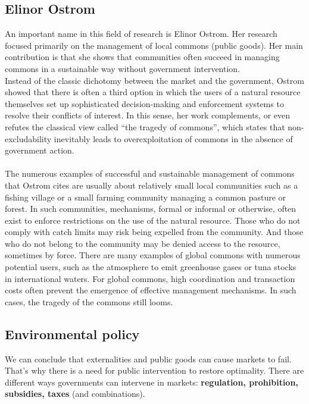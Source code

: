 \documentclass[../summary.tex]{subfiles}
\begin{document}
	\subsection{Elinor Ostrom}
	
	An important name in this field of research is Elinor Ostrom. Her research focused primarily on the management of local commons (public goods). Her main contribution is that she shows that communities often succeed in managing commons in a sustainable way without government intervention.
	\\
	Instead of the classic dichotomy between the market and the government, Ostrom showed that there is often a third option in which the users of a natural resource themselves set up sophisticated decision-making and enforcement systems to resolve their conflicts of interest. In this sense, her work complements, or even refutes the classical view called ``the tragedy of commons'', which states that non-excludability inevitably leads to overexploitation of commons in the absence of government action.
	\\\\
	The numerous examples of successful and sustainable management of commons that Ostrom cites are usually about relatively small local communities such as a fishing village or a small farming community managing a common pasture or forest. In such communities, mechanisms, formal or informal or otherwise, often exist to enforce restrictions on the use of the natural resource. Those who do not comply with catch limits may risk being expelled from the community. And those who do not belong to the community may be denied access to the resource, sometimes by force. There are many examples of global commons with numerous potential users, such as the atmosphere to emit greenhouse gases or tuna stocks in international waters. For global commons, high coordination and transaction costs often prevent the emergence of effective management mechanisms. In such cases, the tragedy of the commons still looms.
	
	\subsection{Environmental policy}
	
	We can conclude that externalities and public goods can cause markets to fail. That's why there is a need for public intervention to restore optimality. There are different ways governments can intervene in markets: \textbf{regulation, prohibition, subsidies, taxes} (and combinations).
	
\end{document}
